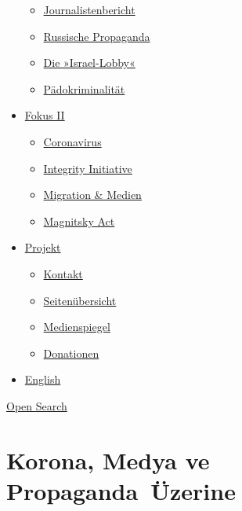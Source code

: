 \begin{itemize}
  \begin{itemize}
  \tightlist
  \item
    \href{https://swprs.org/bericht-eines-journalisten/}{Journalistenbericht}
  \item
    \href{https://swprs.org/russische-propaganda/}{Russische Propaganda}
  \item
    \href{https://swprs.org/die-israel-lobby-fakten-und-mythen/}{Die
    »Israel-Lobby«}
  \item
    \href{https://swprs.org/geopolitik-und-paedokriminalitaet/}{Pädokriminalität}
  \end{itemize}
\item
  \href{https://swprs.org/migration-und-medien/}{Fokus II}

  \begin{itemize}
  \tightlist
  \item
    \href{https://swprs.org/covid-19-hinweis-ii/}{Coronavirus}
  \item
    \href{https://swprs.org/die-integrity-initiative/}{Integrity
    Initiative}
  \item
    \href{https://swprs.org/migration-und-medien/}{Migration \& Medien}
  \item
    \href{https://swprs.org/der-fall-magnitsky/}{Magnitsky Act}
  \end{itemize}
\item
  \href{https://swprs.org/kontakt/}{Projekt}

  \begin{itemize}
  \tightlist
  \item
    \href{https://swprs.org/kontakt/}{Kontakt}
  \item
    \href{https://swprs.org/uebersicht/}{Seitenübersicht}
  \item
    \href{https://swprs.org/medienspiegel/}{Medienspiegel}
  \item
    \href{https://swprs.org/donationen/}{Donationen}
  \end{itemize}
\item
  \href{https://swprs.org/contact/}{English}
\end{itemize}

\protect\hyperlink{}{Open Search}

\hypertarget{korona-medya-ve-propaganda-uxfczerine}{%
\section{Korona, Medya ve
Propaganda~Üzerine}\label{korona-medya-ve-propaganda-uxfczerine}}

